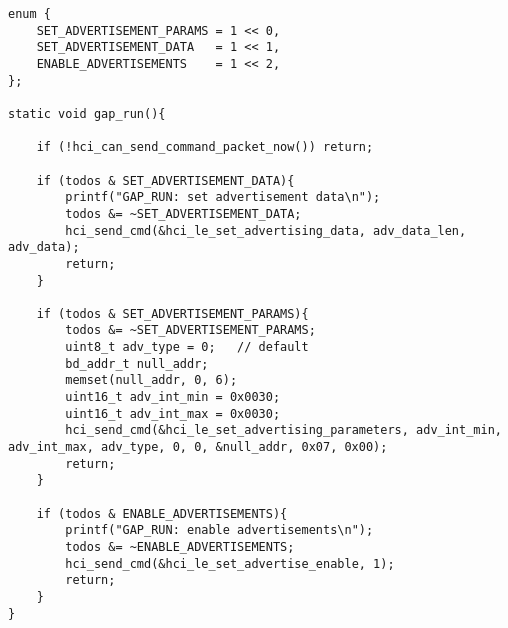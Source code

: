 \begin{lstlisting}[caption= SPP\&LE client - GAP run., label=code:spp_le_gap_run]
enum {
    SET_ADVERTISEMENT_PARAMS = 1 << 0,
    SET_ADVERTISEMENT_DATA   = 1 << 1,
    ENABLE_ADVERTISEMENTS    = 1 << 2,
};

static void gap_run(){

    if (!hci_can_send_command_packet_now()) return;

    if (todos & SET_ADVERTISEMENT_DATA){
        printf("GAP_RUN: set advertisement data\n");
        todos &= ~SET_ADVERTISEMENT_DATA;
        hci_send_cmd(&hci_le_set_advertising_data, adv_data_len, adv_data);
        return;
    }    

    if (todos & SET_ADVERTISEMENT_PARAMS){
        todos &= ~SET_ADVERTISEMENT_PARAMS;
        uint8_t adv_type = 0;   // default
        bd_addr_t null_addr;
        memset(null_addr, 0, 6);
        uint16_t adv_int_min = 0x0030;
        uint16_t adv_int_max = 0x0030;
        hci_send_cmd(&hci_le_set_advertising_parameters, adv_int_min, adv_int_max, adv_type, 0, 0, &null_addr, 0x07, 0x00);
        return;
    }    

    if (todos & ENABLE_ADVERTISEMENTS){
        printf("GAP_RUN: enable advertisements\n");
        todos &= ~ENABLE_ADVERTISEMENTS;
        hci_send_cmd(&hci_le_set_advertise_enable, 1);
        return;
    }
}
\end{lstlisting}

